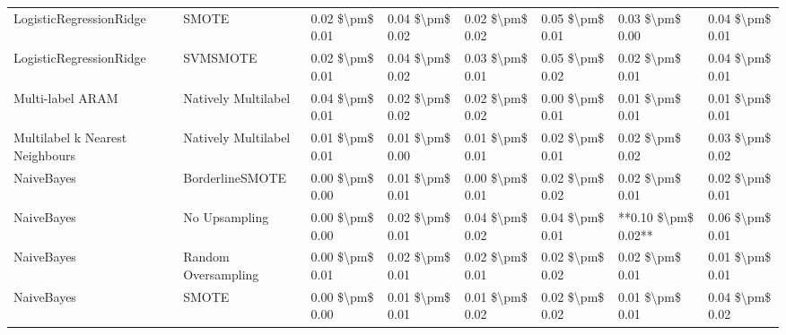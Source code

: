 \begin{tabular}{llllllll}
        LogisticRegressionRidge &                         SMOTE & 0.02 \$\textbackslash pm\$ 0.01 &           0.04 \$\textbackslash pm\$ 0.02 &       0.02 \$\textbackslash pm\$ 0.02 &        0.05 \$\textbackslash pm\$ 0.01 &                         0.03 \$\textbackslash pm\$ 0.00 & 0.04 \$\textbackslash pm\$ 0.01 \\
        LogisticRegressionRidge &                      SVMSMOTE & 0.02 \$\textbackslash pm\$ 0.01 &           0.04 \$\textbackslash pm\$ 0.02 &       0.03 \$\textbackslash pm\$ 0.01 &        0.05 \$\textbackslash pm\$ 0.02 &                         0.02 \$\textbackslash pm\$ 0.01 & 0.04 \$\textbackslash pm\$ 0.01 \\
               Multi-label ARAM &           Natively Multilabel & 0.04 \$\textbackslash pm\$ 0.01 &           0.02 \$\textbackslash pm\$ 0.02 &       0.02 \$\textbackslash pm\$ 0.02 &        0.00 \$\textbackslash pm\$ 0.01 &                         0.01 \$\textbackslash pm\$ 0.01 & 0.01 \$\textbackslash pm\$ 0.01 \\
Multilabel k Nearest Neighbours &           Natively Multilabel & 0.01 \$\textbackslash pm\$ 0.01 &           0.01 \$\textbackslash pm\$ 0.00 &       0.01 \$\textbackslash pm\$ 0.01 &        0.02 \$\textbackslash pm\$ 0.01 &                         0.02 \$\textbackslash pm\$ 0.02 & 0.03 \$\textbackslash pm\$ 0.02 \\
                     NaiveBayes &               BorderlineSMOTE & 0.00 \$\textbackslash pm\$ 0.00 &           0.01 \$\textbackslash pm\$ 0.01 &       0.00 \$\textbackslash pm\$ 0.01 &        0.02 \$\textbackslash pm\$ 0.02 &                         0.02 \$\textbackslash pm\$ 0.01 & 0.02 \$\textbackslash pm\$ 0.01 \\
                     NaiveBayes &                 No Upsampling & 0.00 \$\textbackslash pm\$ 0.00 &           0.02 \$\textbackslash pm\$ 0.01 &       0.04 \$\textbackslash pm\$ 0.02 &        0.04 \$\textbackslash pm\$ 0.01 &                     **0.10 \$\textbackslash pm\$ 0.02** & 0.06 \$\textbackslash pm\$ 0.01 \\
                     NaiveBayes &           Random Oversampling & 0.00 \$\textbackslash pm\$ 0.01 &           0.02 \$\textbackslash pm\$ 0.01 &       0.02 \$\textbackslash pm\$ 0.01 &        0.02 \$\textbackslash pm\$ 0.02 &                         0.02 \$\textbackslash pm\$ 0.01 & 0.01 \$\textbackslash pm\$ 0.01 \\
                     NaiveBayes &                         SMOTE & 0.00 \$\textbackslash pm\$ 0.00 &           0.01 \$\textbackslash pm\$ 0.01 &       0.01 \$\textbackslash pm\$ 0.02 &        0.02 \$\textbackslash pm\$ 0.02 &                         0.01 \$\textbackslash pm\$ 0.01 & 0.04 \$\textbackslash pm\$ 0.02 \\

\end{tabular}
